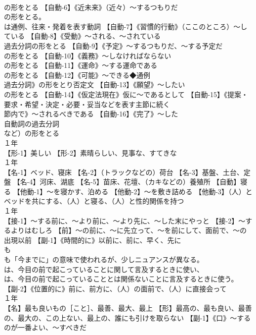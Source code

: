 \documentclass[8pt]{extreport}
\begin{document}
\begin{CJK}{UTF8}{min}
\\	の形をとる 【自動-6】《近未来》（近々）～するつもりだ
\\	の形をとる。
\\	は通例、往来・発着を表す動詞 【自動-7】《習慣的行動》（ここのところ）～している 【自動-8】《受動》～される、～されている
\\	過去分詞の形をとる 【自動-9】《予定》～するつもりだ、～する予定だ
\\	の形をとる 【自動-10】《義務》～しなければならない
\\	の形をとる 【自動-11】《運命》～する運命である
\\	の形をとる 【自動-12】《可能》～できる◆通例
\\	過去分詞》の形をとり否定文 【自動-13】《願望》～したい
\\	の形をとる 【自動-14】《仮定法現在》仮に～であるとして 【自動-15】《提案・要求・希望・決定・必要・妥当などを表す主節に続く 
\\	節内で》～されるべきである 【自動-16】《完了》～した
\\	自動詞の過去分詞
\\	など）の形をとる
\\	１年	
\\	【形-1】美しい 【形-2】素晴らしい、見事な、すてきな
\\	１年	
\\	【名-1】ベッド、寝床 【名-2】（トラックなどの）荷台 【名-3】基盤、土台、定盤 【名-4】河床、湖底 【名-5】苗床、花壇、（カキなどの）養殖所 【自動】寝る 【他動-1】～を寝かす、泊める 【他動-2】～を敷き詰める 【他動-3】（人）とベッドを共にする、（人）と寝る、（人）と性的関係を持つ
\\	１年	
\\	【接-1】～する前に、～より前に、～より先に、～した末にやっと 【接-2】～するよりはむしろ 【前】～の前に、～に先立って、～を前にして、面前で、～の出現以前 【副-1】《時間的に》以前に、前に、早く、先に
\\	も 
\\	も「今までに」の意味で使われるが、少しニュアンスが異なる。
\\	は、今目の前で起こっていることに関して言及するときに使い、
\\	は、今目の前で起こっていることとは関係ないことに言及するときに使う。 【副-2】《位置的に》前に、前方に、（人）の面前で、（人）に直接会って
\\	１年	
\\	【名】最も良いもの［こと］、最善、最大、最上 【形】最高の、最も良い、最善の、最大の、この上ない、最上の、誰にも引けを取らない 【副-1】《口》～するのが一番よい、～すべきだ

\end{CJK}
\end{document}
